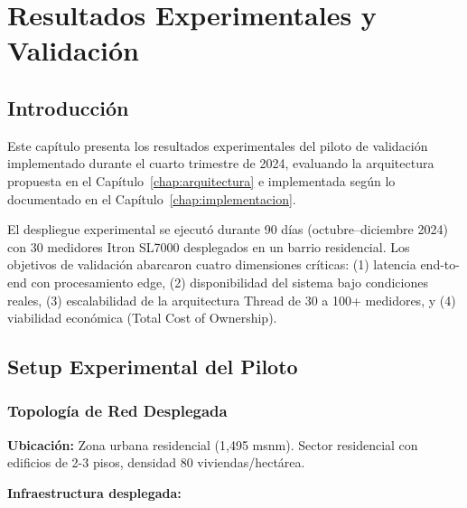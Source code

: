 ﻿\chapter{Resultados Experimentales y Validación}
\label{chap:resultados}


\section{Introducción}
\label{sec:res-intro}

Este capítulo presenta los resultados experimentales del piloto de validación implementado durante el cuarto trimestre de 2024, evaluando la arquitectura propuesta en el Capítulo~\ref{chap:arquitectura} e implementada según lo documentado en el Capítulo~\ref{chap:implementacion}.

El despliegue experimental se ejecutó durante 90 días (octubre--diciembre 2024) con 30 medidores Itron SL7000 desplegados en un barrio residencial. Los objetivos de validación abarcaron cuatro dimensiones críticas: (1) latencia end-to-end con procesamiento edge, (2) disponibilidad del sistema bajo condiciones reales, (3) escalabilidad de la arquitectura Thread de 30 a 100+ medidores, y (4) viabilidad económica (Total Cost of Ownership).

\section{Setup Experimental del Piloto}
\label{sec:res-setup}

\subsection{Topología de Red Desplegada}
\label{sec:res-topologia}

\textbf{Ubicación:} Zona urbana residencial (1,495 msnm). Sector residencial con edificios de 2-3 pisos, densidad 80 viviendas/hectárea.

\textbf{Infraestructura desplegada:}

